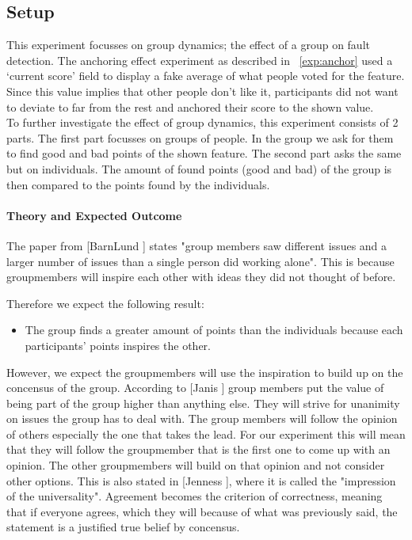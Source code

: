 \documentclass[main.tex]{subfiles}
\begin{document}
\subsection{Setup}
This experiment focusses on group dynamics; the effect of a group on fault detection. The anchoring effect experiment as described in ~\ref{exp:anchor} used a `current score' field to display a fake average of what people voted for the feature. Since this value implies that other people don't like it, participants did not want to deviate to far from the rest and anchored their score to the shown value. \\
To further investigate the effect of group dynamics, this experiment consists of 2 parts. The first part focusses on groups of people. In the group we ask for them to find good and bad points of the shown feature. The second part asks the same but on individuals. The amount of found points (good and bad) of the group is then compared to the points found by the individuals.

\paragraph{Theory and Expected Outcome}
The paper from [BarnLund \cite{barnlund}] states "group members saw different issues and a larger number of issues than a single person did working alone". This is because groupmembers will inspire each other with ideas they did not thought of before. 

Therefore we expect the following result:
\begin{itemize}
\item The group finds a greater amount of points than the individuals because each participants' points inspires the other. 
\end{itemize}

However, we expect the groupmembers will use the inspiration to build up on the concensus of the group.
According to [Janis \cite{janis}] group members put the value of being part of the group higher than anything else. They will strive for unanimity on issues the group has to deal with. The group members will follow the opinion of others especially the one that takes the lead. For our experiment this will mean that they will follow the groupmember that is the first one to come up with an opinion. The other groupmembers will build on that opinion and not consider other options. This is also stated in [Jenness \cite{jenness}], where it is called the "impression of the universality". Agreement becomes the criterion of correctness, meaning that if everyone agrees, which they will because of what was previously said, the statement is a justified true belief by concensus.
\end{document}
